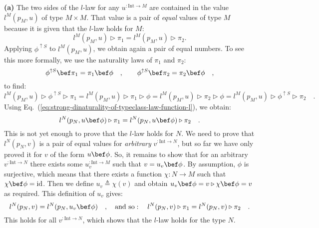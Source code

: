 \textbf{(a)} The two sides of the $l$-law for any $u^{:\text{Int}\rightarrow M}$
are contained in the value $l^{M}(p_{M},u)$ of type $M\times M$.
That value is a pair of \emph{equal} values of type $M$ because it
is given that the $l$-law holds for $M$:
\[
l^{M}(p_{M},u)\triangleright\pi_{1}=l^{M}(p_{M},u)\triangleright\pi_{2}.
\]
Applying $\phi^{\uparrow S}$ to $l^{M}(p_{M},u)$, we obtain again
a pair of equal numbers. To see this more formally, we use the naturality
laws of $\pi_{1}$ and $\pi_{2}$:
\[
\phi^{\uparrow S}\bef\pi_{1}=\pi_{1}\bef\phi\quad,\quad\quad\phi^{\uparrow S}\bef\pi_{2}=\pi_{2}\bef\phi\quad,
\]
to find:
\[
l^{M}(p_{M},u)\triangleright\phi^{\uparrow S}\triangleright\pi_{1}=l^{M}(p_{M},u)\triangleright\pi_{1}\triangleright\phi=l^{M}(p_{M},u)\triangleright\pi_{2}\triangleright\phi=l^{M}(p_{M},u)\triangleright\phi^{\uparrow S}\triangleright\pi_{2}\quad.
\]
Using Eq.~(\ref{eq:strong-dinaturality-of-typeclass-law-function-l}),
we obtain:
\[
l^{N}(p_{N},u\bef\phi)\triangleright\pi_{1}=l^{N}(p_{N},u\bef\phi)\triangleright\pi_{2}\quad.
\]
This is not yet enough to prove that the $l$-law holds for $N$.
We need to prove that $l^{N}(p_{N},v)$ is a pair of equal values
for \emph{arbitrary} $v^{:\text{Int}\rightarrow N}$, but so far we
have only proved it for $v$ of the form $u\bef\phi$. So, it remains
to show that for an arbitrary $v^{:\text{Int}\rightarrow N}$ there
exists some $u_{v}^{:\text{Int}\rightarrow M}$ such that $v=u_{v}\bef\phi$.
By assumption, $\phi$ is surjective, which means that there exists
a function $\chi:N\rightarrow M$ such that $\chi\bef\phi=\text{id}$.
Then we define $u_{v}\triangleq\chi(v)$ and obtain $u_{v}\bef\phi=v\triangleright\chi\bef\phi=v$
as required. This definition of $u_{v}$ gives: 
\[
l^{N}(p_{N},v)=l^{N}(p_{N},u_{v}\bef\phi)\quad,\quad\text{and so}:\quad l^{N}(p_{N},v)\triangleright\pi_{1}=l^{N}(p_{N},v)\triangleright\pi_{2}\quad.
\]
 This holds for all $v^{:\text{Int}\rightarrow N}$, which shows that
the $l$-law holds for the type $N$.

